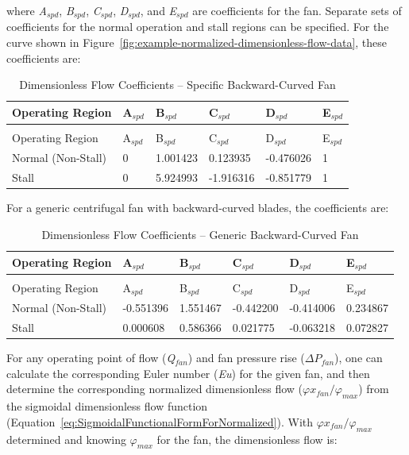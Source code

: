 where \emph{A\(_{spd}\)}, \emph{B\(_{spd}\)}, \emph{C\(_{spd}\)}, \emph{D\(_{spd}\)}, and \emph{E\(_{spd}\)} are coefficients for the fan. Separate sets of coefficients for the normal operation and stall regions can be specified. For the curve shown in Figure~\ref{fig:example-normalized-dimensionless-flow-data}, these coefficients are:

\begin{longtable}[c]{@{}llllll@{}}
\caption{Dimensionless Flow Coefficients – Specific Backward-Curved Fan \label{table:dimensionless-flow-coefficients-specific}} \tabularnewline
\toprule
Operating Region & A\(_{spd}\) & B\(_{spd}\) & C\(_{spd}\) & D\(_{spd}\) & E\(_{spd}\) \tabularnewline
\midrule
\endfirsthead

\caption[]{Dimensionless Flow Coefficients – Specific Backward-Curved Fan} \tabularnewline
\toprule
Operating Region & A\(_{spd}\) & B\(_{spd}\) & C\(_{spd}\) & D\(_{spd}\) & E\(_{spd}\) \tabularnewline
\midrule
\endhead

Normal (Non-Stall) & 0 & 1.001423 & 0.123935 & -0.476026 & 1 \tabularnewline
Stall & 0 & 5.924993 & -1.916316 & -0.851779 & 1 \tabularnewline
\bottomrule
\end{longtable}

For a generic centrifugal fan with backward-curved blades, the coefficients are:

\begin{longtable}[c]{@{}llllll@{}}
\caption{Dimensionless Flow Coefficients – Generic Backward-Curved Fan \label{table:dimensionless-flow-coefficients-generic}} \tabularnewline
\toprule
Operating Region & A\(_{spd}\) & B\(_{spd}\) & C\(_{spd}\) & D\(_{spd}\) & E\(_{spd}\) \tabularnewline
\midrule
\endfirsthead

\caption[]{Dimensionless Flow Coefficients – Generic Backward-Curved Fan} \tabularnewline
\toprule
Operating Region & A\(_{spd}\) & B\(_{spd}\) & C\(_{spd}\) & D\(_{spd}\) & E\(_{spd}\) \tabularnewline
\midrule
\endhead

Normal (Non-Stall) & -0.551396 & 1.551467 & -0.442200 & -0.414006 & 0.234867 \tabularnewline
Stall & 0.000608 & 0.586366 & 0.021775 & -0.063218 & 0.072827 \tabularnewline
\bottomrule
\end{longtable}

For any operating point of flow (\emph{Q\(_{fan}\)}) and fan pressure rise (\(\Delta {P_{fan}}\)), one can calculate the corresponding Euler number (\emph{Eu}) for the given fan, and then determine the corresponding normalized dimensionless flow (\(\varphi {x_{fan}} / \varphi_{max}\)) from the sigmoidal dimensionless flow function (Equation~\ref{eq:SigmoidalFunctionalFormForNormalized}). With \(\varphi {x_{fan}} / \varphi_{max}\) determined and knowing \(\varphi_{max}\) for the fan, the dimensionless flow is:

